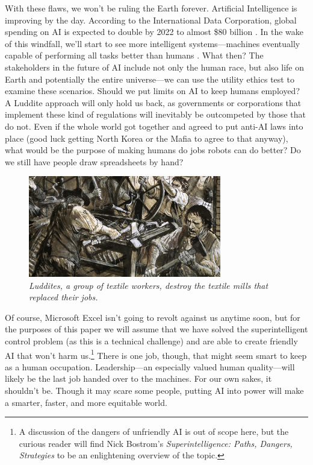 \documentclass[12pt]{article}
\newenvironment{quote_1in}%
  {\list{}{\leftmargin=1in\rightmargin=1in}\item[]}%
  {\endlist}
\begin{document}
With these flaws, we won't be ruling the Earth forever. Artificial Intelligence is improving by the day. According to the International Data Corporation, global spending on AI is expected to double by 2022 to almost \$80 billion \cite{globalAI}. In the wake of this windfall, we'll start to see more intelligent systems---machines eventually capable of performing all tasks better than humans \cite{bostrom2005history}. What then? The stakeholders in the future of AI include not only the human race, but also life on Earth and potentially the entire universe---we can use the utility ethics test to examine these scenarios. Should we put limits on AI to keep humans employed? A Luddite approach will only hold us back, as governments or corporations that implement these kind of regulations will inevitably be outcompeted by those that do not. Even if the whole world got together and agreed to put anti-AI laws into place (good luck getting North Korea or the Mafia to agree to that anyway), what would be the purpose of making humans do jobs robots can do better? Do we still have people draw spreadsheets by hand?
\begin{figure}[b!]
\bigskip
\centering
\includegraphics[width=0.75\textwidth]{luddites.jpg}
\begin{quote_1in}
    \caption{
    \textit{Luddites, a group of textile workers, destroy the textile mills that replaced their jobs.} \cite{luddites}}
\end{quote_1in}
\end{figure}
Of course, Microsoft Excel isn't going to revolt against us anytime soon, but for the purposes of this paper we will assume that we have solved the superintelligent control problem (as this is a technical challenge) and are able to create friendly AI that won't harm us.\footnote{A discussion of the dangers of unfriendly AI is out of scope here, but the curious reader will find Nick Bostrom's \textit{Superintelligence: Paths, Dangers, Strategies} \cite{bostrom2014superintelligence} to be an enlightening overview of the topic.}
There is one job, though, that might seem smart to keep as a human occupation. Leadership---an especially valued human quality---will likely be the last job handed over to the machines. For our own sakes, it shouldn't be.
Though it may scare some people, putting AI into power will make a smarter, faster, and more equitable world. %
\end{document}
